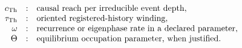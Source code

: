 \setcounter{equation}{27}
\begin{equation}
\begin{array}{rcl}
c_{\mathrm{Th}}&:&\text{causal reach per irreducible event depth},\\
\tau_{\mathrm{Th}}&:&\text{oriented registered-history winding},\\
\omega&:&\text{recurrence or eigenphase rate in a declared parameter},\\
\Theta&:&\text{equilibrium occupation parameter, when justified}.
\end{array}
\end{equation}
